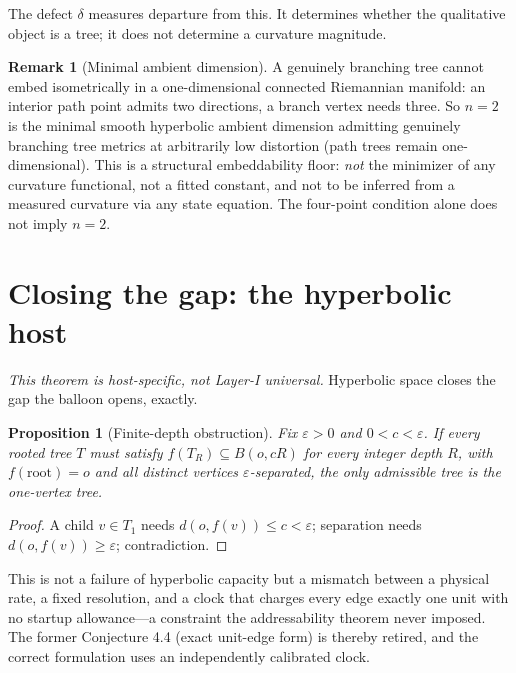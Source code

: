 \documentclass[11pt,reqno]{amsart}
\theoremstyle{plain}
\newtheorem{proposition}[theorem]{Proposition}
\theoremstyle{definition}
\newtheorem{remark}[theorem]{Remark}
\newcommand{\eps}{\varepsilon}
\begin{document}
The defect $\delta$ measures departure from this. It determines whether the qualitative object is a tree; it does not determine a curvature magnitude.

\begin{remark}[Minimal ambient dimension]\label{rem:floor}
A genuinely branching tree cannot embed isometrically in a one-dimensional connected Riemannian manifold: an interior path point admits two directions, a branch vertex needs three. So $n=2$ is the minimal smooth hyperbolic ambient dimension admitting genuinely branching tree metrics at arbitrarily low distortion (path trees remain one-dimensional). This is a structural embeddability floor: \emph{not} the minimizer of any curvature functional, not a fitted constant, and not to be inferred from a measured curvature via any state equation. The four-point condition alone does not imply $n=2$.
\end{remark}

\section{Closing the gap: the hyperbolic host}\label{sec:relational}

\emph{This theorem is host-specific, not Layer-I universal.} Hyperbolic space closes the gap the balloon opens, exactly.

\begin{proposition}[Finite-depth obstruction]\label{prop:finitedepth}
Fix $\eps>0$ and $0<c<\eps$. If every rooted tree $T$ must satisfy $f(T_R)\subseteq B(o,cR)$ for every integer depth $R$, with $f(\mathrm{root})=o$ and all distinct vertices $\eps$-separated, the only admissible tree is the one-vertex tree.
\end{proposition}

\begin{proof}
A child $v\in T_1$ needs $d(o,f(v))\le c<\eps$; separation needs $d(o,f(v))\ge\eps$; contradiction.
\end{proof}

This is not a failure of hyperbolic capacity but a mismatch between a physical rate, a fixed resolution, and a clock that charges every edge exactly one unit with no startup allowance---a constraint the addressability theorem never imposed. The former Conjecture 4.4 (exact unit-edge form) is thereby retired, and the correct formulation uses an independently calibrated clock.
\end{document}
